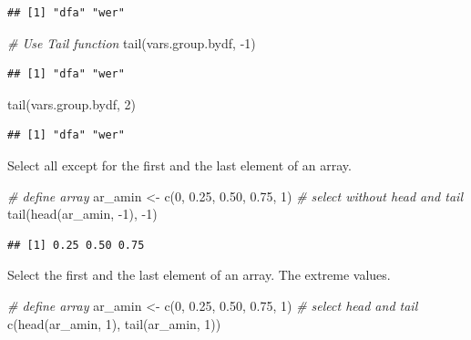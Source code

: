 \documentclass[
]{book}
\newenvironment{Shaded}{\begin{snugshade}}{\end{snugshade}}
\newcommand{\CommentTok}[1]{\textcolor[rgb]{0.56,0.35,0.01}{\textit{#1}}}
\newcommand{\DecValTok}[1]{\textcolor[rgb]{0.00,0.00,0.81}{#1}}
\newcommand{\FloatTok}[1]{\textcolor[rgb]{0.00,0.00,0.81}{#1}}
\newcommand{\FunctionTok}[1]{\textcolor[rgb]{0.00,0.00,0.00}{#1}}
\newcommand{\NormalTok}[1]{#1}
\newcommand{\OtherTok}[1]{\textcolor[rgb]{0.56,0.35,0.01}{#1}}
\newcommand{\SpecialCharTok}[1]{\textcolor[rgb]{0.00,0.00,0.00}{#1}}
\begin{document}
\begin{verbatim}
## [1] "dfa" "wer"
\end{verbatim}

\begin{Shaded}
\begin{Highlighting}[]
\CommentTok{\# Use Tail function}
\FunctionTok{tail}\NormalTok{(vars.group.bydf, }\SpecialCharTok{{-}}\DecValTok{1}\NormalTok{)}
\end{Highlighting}
\end{Shaded}

\begin{verbatim}
## [1] "dfa" "wer"
\end{verbatim}

\begin{Shaded}
\begin{Highlighting}[]
\FunctionTok{tail}\NormalTok{(vars.group.bydf, }\DecValTok{2}\NormalTok{)}
\end{Highlighting}
\end{Shaded}

\begin{verbatim}
## [1] "dfa" "wer"
\end{verbatim}

Select all except for the first and the last element of an array.

\begin{Shaded}
\begin{Highlighting}[]
\CommentTok{\# define array}
\NormalTok{ar\_amin }\OtherTok{\textless{}{-}} \FunctionTok{c}\NormalTok{(}\DecValTok{0}\NormalTok{, }\FloatTok{0.25}\NormalTok{, }\FloatTok{0.50}\NormalTok{, }\FloatTok{0.75}\NormalTok{, }\DecValTok{1}\NormalTok{)}
\CommentTok{\# select without head and tail}
\FunctionTok{tail}\NormalTok{(}\FunctionTok{head}\NormalTok{(ar\_amin, }\SpecialCharTok{{-}}\DecValTok{1}\NormalTok{), }\SpecialCharTok{{-}}\DecValTok{1}\NormalTok{)}
\end{Highlighting}
\end{Shaded}

\begin{verbatim}
## [1] 0.25 0.50 0.75
\end{verbatim}

Select the first and the last element of an array. The extreme values.

\begin{Shaded}
\begin{Highlighting}[]
\CommentTok{\# define array}
\NormalTok{ar\_amin }\OtherTok{\textless{}{-}} \FunctionTok{c}\NormalTok{(}\DecValTok{0}\NormalTok{, }\FloatTok{0.25}\NormalTok{, }\FloatTok{0.50}\NormalTok{, }\FloatTok{0.75}\NormalTok{, }\DecValTok{1}\NormalTok{)}
\CommentTok{\# select head and tail}
\FunctionTok{c}\NormalTok{(}\FunctionTok{head}\NormalTok{(ar\_amin, }\DecValTok{1}\NormalTok{), }\FunctionTok{tail}\NormalTok{(ar\_amin, }\DecValTok{1}\NormalTok{))}
\end{Highlighting}
\end{Shaded}
\end{document}
